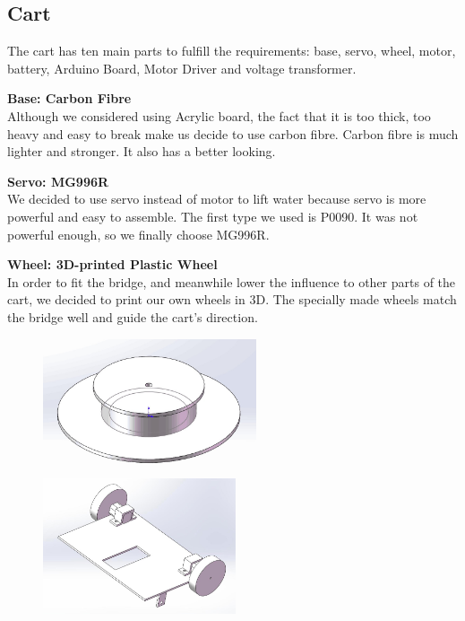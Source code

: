 \subsection{Cart}

The cart has ten main parts to fulfill the requirements: base, servo, wheel,
motor, battery, Arduino Board, Motor Driver and voltage transformer.

\bigskip
\noindent
\textbf{Base: Carbon Fibre} \\
\indent
Although we considered using Acrylic board, the fact that it is too thick, too
heavy and easy to break make us decide to use carbon fibre.
Carbon fibre is much lighter and stronger.
It also has a better looking. 

\bigskip
\noindent
\textbf{Servo: MG996R}  \\
\indent
We decided to use servo instead of motor to lift water because servo is more
powerful and easy to assemble. 
The first type we used is P0090.
It was not powerful enough, so we finally choose MG996R. 

\bigskip
\noindent
\textbf{Wheel: 3D-printed Plastic Wheel } \\
\indent
In order to fit the bridge, and meanwhile lower the influence to other parts of
the cart, we decided to print our own wheels in 3D.
The specially made wheels match the bridge well and guide the cart’s direction.

\begin{figure}[H]
\begin{center}
\includegraphics[height=4cm]{figure/designOverview/p2}
\includegraphics[height=4cm]{figure/designOverview/p1}
\end{center}
\end{figure}

